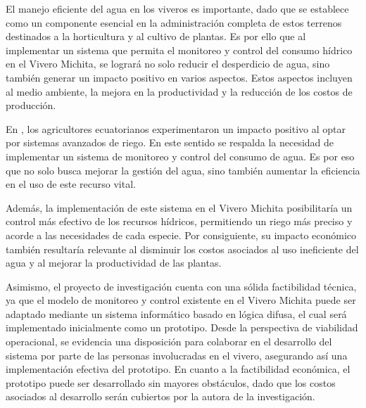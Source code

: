 El manejo eficiente del agua en los viveros es importante, dado que se establece como un componente esencial en la administración completa de estos terrenos destinados a la horticultura y al cultivo de plantas. Es por ello que al implementar un sistema que permita el monitoreo y control del consumo hídrico en el Vivero Michita, se logrará no solo reducir el desperdicio de agua, sino también generar un impacto positivo en varios aspectos. Estos aspectos incluyen al medio ambiente, la mejora en la productividad y la reducción de los costos de producción.

\bigbreak 
En \cite{riego_tecnificado}, los  agricultores ecuatorianos experimentaron un impacto positivo al optar por sistemas avanzados de riego. En este sentido se respalda la necesidad de implementar un sistema de monitoreo y control del consumo de agua. Es por eso que no solo busca mejorar la gestión del agua, sino también aumentar la eficiencia en el uso de este recurso vital.

\bigbreak 
Además, la implementación de este sistema en el Vivero Michita posibilitaría un control más efectivo de los recursos hídricos, permitiendo un riego más preciso y acorde a las necesidades de cada especie. Por consiguiente, su impacto económico también resultaría relevante al disminuir los costos asociados al uso ineficiente del agua y al mejorar la productividad de las plantas.

\bigbreak 
Asimismo, el proyecto de investigación cuenta con una sólida factibilidad técnica, ya que el modelo de monitoreo y control existente en el Vivero Michita puede ser adaptado mediante un sistema informático basado en lógica difusa, el cual será implementado inicialmente como un prototipo. Desde la perspectiva de viabilidad operacional, se evidencia una disposición para colaborar en el desarrollo del sistema por parte de las personas involucradas en el vivero, asegurando así una implementación efectiva del prototipo. En cuanto a la factibilidad económica, el prototipo puede ser desarrollado sin mayores obstáculos, dado que los costos asociados al desarrollo serán cubiertos por la autora de la investigación.

